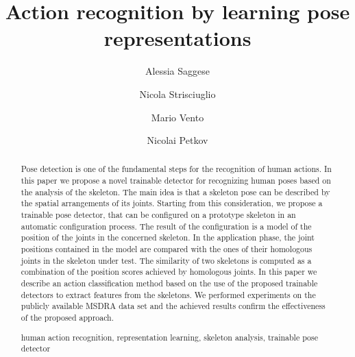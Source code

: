 \documentclass[runningheads,a4paper]{llncs}
\newcommand{\keywords}[1]{\par\addvspace\baselineskip
\noindent\keywordname\enspace\ignorespaces#1}
\begin{document}
\sloppy
\mainmatter  %

\title{Action recognition by learning pose representations}



\author{Alessia Saggese \and Nicola Strisciuglio
 \and Mario Vento \and Nicolai Petkov}



\maketitle


\begin{abstract}
Pose detection is one of the fundamental steps for the recognition of human actions.
In this paper we propose a novel trainable detector for recognizing human poses based on the analysis of the skeleton. 
The main idea is that a skeleton pose can be described by the spatial arrangements of its joints.
Starting from this consideration, we propose a trainable pose detector, that can be configured on a prototype skeleton in an automatic configuration process. The result of the configuration is a model of the position of the joints in the concerned skeleton. In the application phase, the joint positions contained in the model are compared with the ones of their homologous joints in the skeleton under test. The similarity of two skeletons is computed as a combination of the position scores achieved by homologous joints.
In this paper we describe an action classification method based on the use of the proposed trainable detectors to extract features from the skeletons. We performed experiments on the publicly available MSDRA data set and the achieved results confirm the effectiveness of the proposed approach.

\keywords{human action recognition, representation learning, skeleton analysis, trainable pose detector}
\end{abstract}
\end{document}
